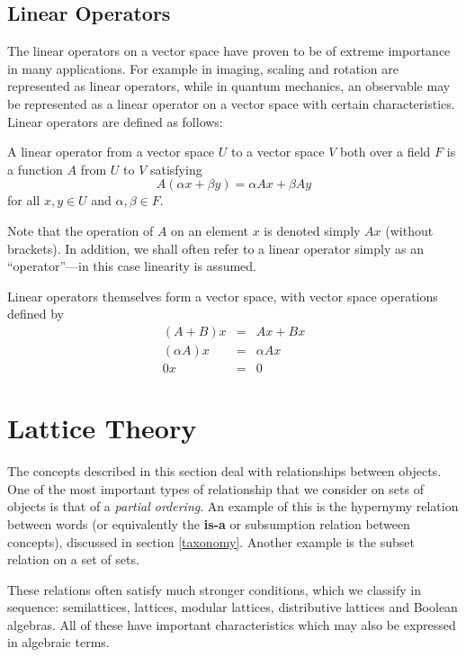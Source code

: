 \documentclass[12pt]{report}
\begin{document}
\subsection{Linear Operators}
\label{operators}

The linear operators on a vector space have proven to be of extreme importance in many applications. For example in imaging, scaling and rotation are represented as linear operators, while in quantum mechanics, an observable may be represented as a linear operator on a vector space with certain characteristics. Linear operators are defined as follows:
\begin{defn}
A linear operator from a vector space $U$ to a vector space $V$ both over a field $F$ is a function $A$ from $U$ to $V$ satisfying
$$A(\alpha x + \beta y) = \alpha Ax + \beta Ay$$
for all $x,y \in U$ and $\alpha, \beta \in F$.
\end{defn}
Note that the operation of $A$ on an element $x$ is denoted simply $Ax$ (without brackets). In addition, we shall often refer to a linear operator simply as an ``operator''---in this case linearity is assumed.

Linear operators themselves form a vector space, with vector space operations defined by
\begin{eqnarray*}
(A + B)x&=&Ax + Bx\\
(\alpha A)x&=&\alpha Ax\\
0x&=&0
\end{eqnarray*}

\section{Lattice Theory}
\label{lattices}

The concepts described in this section deal with relationships between objects. One of the most important types of relationship that we consider on sets of objects is that of a \emph{partial ordering}. An example of this is the hypernymy relation between words (or equivalently the \textbf{is-a} or subsumption relation between concepts), discussed in section \ref{taxonomy}. Another example is the subset relation on a set of sets.

These relations often satisfy much stronger conditions, which we classify in sequence: semilattices, lattices, modular lattices, distributive lattices and Boolean algebras. All of these have important characteristics which may also be expressed in algebraic terms.
\end{document}
